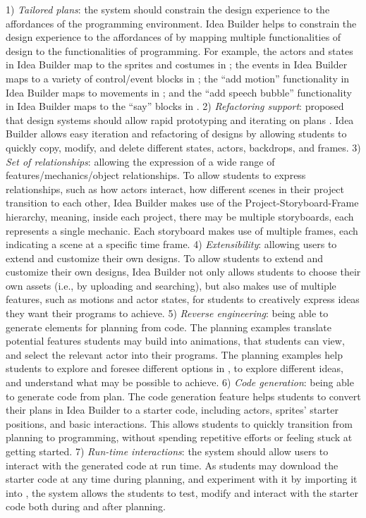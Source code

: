 1)  \emph{Tailored plans}: the system should constrain the design experience to the affordances of the programming environment. Idea Builder helps to constrain the design experience to the affordances of \snap by mapping multiple functionalities of design to the functionalities of programming. For example, the actors and states in Idea Builder map to the sprites and costumes in \snap; the events in Idea Builder maps to a variety of control/event blocks in \snap; the ``add motion'' functionality in Idea Builder maps to movements in \snap; and the ``add speech bubble'' functionality in Idea Builder maps to the ``say'' blocks in \snap.
2) \emph{Refactoring support}: \citeauthor{alphonce2005green} proposed that design systems should allow rapid prototyping and iterating on plans \cite{alphonce2005green}. Idea Builder allows easy iteration and refactoring of designs by allowing students to quickly copy, modify, and delete different states, actors, backdrops, and frames. 
3) \emph{Set of relationships}: allowing the expression of a wide range of features/mechanics/object relationships. To allow students to express relationships, such as how actors interact, how different scenes in their project transition to each other, Idea Builder makes use of the Project-Storyboard-Frame hierarchy, meaning, inside each project, there may be multiple storyboards, each represents a single mechanic. Each storyboard makes use of multiple frames, each indicating a scene at a specific time frame. 
4) \emph{Extensibility}:  allowing users to extend and customize their own designs.  To allow students to extend and customize their own designs, Idea Builder not only allows students to choose their own assets (i.e., by uploading and searching), but also makes use of multiple features, such as motions and actor states, for students to creatively express ideas they want their programs to achieve. 
5)  \emph{Reverse engineering}: being able to generate elements for planning from code.  The planning examples translate potential features students may build into animations, that students can view, and select the relevant actor into their programs. The planning examples help students to explore and foresee different options in \snap, to explore different ideas, and understand what may be possible to achieve. 
6)  \emph{Code generation}: being able to generate code from plan. The code generation feature helps students to convert their plans in Idea Builder to a starter code, including actors, sprites' starter positions, and basic interactions. This allows students to quickly transition from planning to programming, without spending repetitive efforts or feeling stuck at getting started. 
7) \emph{Run-time interactions}: the system should allow users to interact with the generated code at run time. As students may download the starter code at any time during planning, and experiment with it by importing it into \snap, the system allows the students to test, modify and interact with the starter code both during and after planning. 




